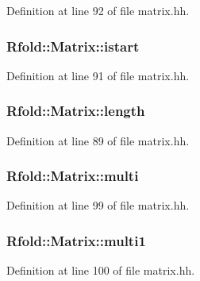 Definition at line 92 of file matrix.\+hh.

\hypertarget{class_rfold_1_1_matrix_a5880f2f8bd4be305049d3149334370e7}{
\subsubsection[{istart}]{ Rfold\+::\+Matrix\+::istart}}\label{class_rfold_1_1_matrix_a5880f2f8bd4be305049d3149334370e7}


Definition at line 91 of file matrix.\+hh.

\hypertarget{class_rfold_1_1_matrix_a4e28e0237e378feced3ce0497b0280d3}{
\subsubsection[{length}]{ Rfold\+::\+Matrix\+::length}}\label{class_rfold_1_1_matrix_a4e28e0237e378feced3ce0497b0280d3}


Definition at line 89 of file matrix.\+hh.

\hypertarget{class_rfold_1_1_matrix_aae63edf0279f08764bf31766c2015daf}{
\subsubsection[{multi}]{ Rfold\+::\+Matrix\+::multi}}\label{class_rfold_1_1_matrix_aae63edf0279f08764bf31766c2015daf}


Definition at line 99 of file matrix.\+hh.

\hypertarget{class_rfold_1_1_matrix_a60276112ff38bf30f411846caa101ad4}{
\subsubsection[{multi1}]{ Rfold\+::\+Matrix\+::multi1}}\label{class_rfold_1_1_matrix_a60276112ff38bf30f411846caa101ad4}


Definition at line 100 of file matrix.\+hh.

